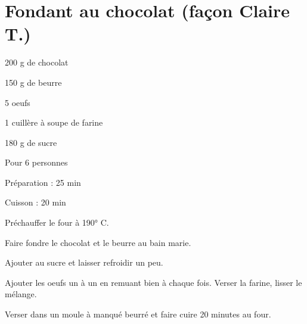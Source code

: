 \section[\normalsize{Fondant au chocolat (façon Claire T.)}]{Fondant au chocolat (façon Claire T.)}

\begin{ingredients}
\item 200 g de chocolat
\item 150 g de beurre
\item 5 oeufs
\item 1 cuill\`ere \`a soupe de farine
\item 180 g de sucre
\end{ingredients}
\begin{infos}
\item Pour 6 personnes
\item Préparation : 25 min
\item Cuisson : 20 min
\end{infos}
\begin{etapes}
\item Pr\'echauffer le four \`a 190° C.
\item Faire fondre le chocolat et le beurre au bain marie. 
\item Ajouter au sucre et laisser refroidir un peu. 
\item Ajouter les oeufs un \`a un en remuant bien \`a chaque fois. Verser la farine, lisser le m\'elange.
\item Verser dans un moule \`a manqu\'e beurr\'e et faire cuire 20 minutes au four.
\end{etapes}
\begin{conseils}
\end{conseils}
